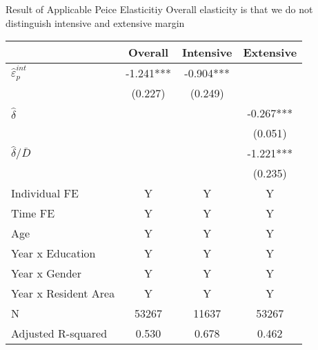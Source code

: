 \documentclass[
  ignorenonframetext,
  aspectratio=169,
]{beamer}
\begin{document}
\begin{frame}{Result of Applicable Peice Elasticitiy}
\protect\hypertarget{result-of-applicable-peice-elasticitiy}{}
Overall elasticity is that we do not distinguish intensive and extensive margin

\begin{table}
\centering\begingroup\fontsize{8}{10}\selectfont

\begin{tabular}{lccc}
\toprule
 & Overall & Intensive & Extensive\\
\midrule
$\hat{\varepsilon}_p^{int}$ & -1.241*** & -0.904*** & \\
 & (0.227) & (0.249) & \\
$\hat{\delta}$ &  &  & -0.267***\\
 &  &  & (0.051)\\
$\hat{\delta}/\bar{D}$ &  &  & -1.221***\\
 &  &  & (0.235)\\
Individual FE & Y & Y & Y\\
Time FE & Y & Y & Y\\
Age & Y & Y & Y\\
Year x Education & Y & Y & Y\\
Year x Gender & Y & Y & Y\\
Year x Resident Area & Y & Y & Y\\
N & 53267 & 11637 & 53267\\
Adjusted R-squared & 0.530 & 0.678 & 0.462\\
\bottomrule
\end{tabular}
\endgroup{}
\end{table}
\end{frame}
\end{document}
